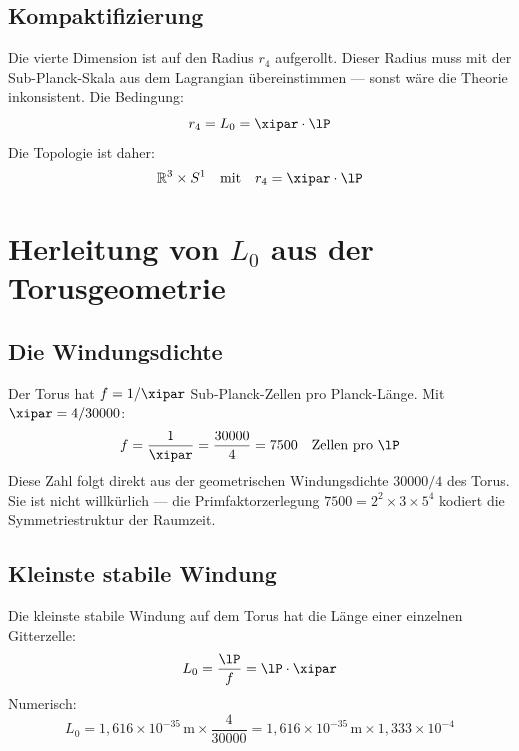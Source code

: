 \subsection{Kompaktifizierung}

Die vierte Dimension ist auf den Radius $r_4$ aufgerollt. Dieser Radius muss mit der Sub-Planck-Skala aus dem Lagrangian übereinstimmen — sonst wäre die Theorie inkonsistent. Die Bedingung:
\begin{equation}
	r_4 = L_0 = \xipar \cdot \lP
\end{equation}
Die Topologie ist daher:
\begin{equation}
	\mathbb{R}^3 \times S^1 \quad \text{mit} \quad r_4 = \xipar \cdot \lP
\end{equation}

\section{Herleitung von \texorpdfstring{$L_0$}{L0} aus der Torusgeometrie}

\subsection{Die Windungsdichte}

Der Torus hat $f = 1/\xipar$ Sub-Planck-Zellen pro Planck-Länge. Mit $\xipar = 4/30000$:
\begin{equation}
	f = \frac{1}{\xipar} = \frac{30000}{4} = 7500 \quad \text{Zellen pro } \lP
\end{equation}
Diese Zahl folgt direkt aus der geometrischen Windungsdichte $30000/4$ des Torus. Sie ist nicht willkürlich — die Primfaktorzerlegung $7500 = 2^2 \times 3 \times 5^4$ kodiert die Symmetriestruktur der Raumzeit.

\subsection{Kleinste stabile Windung}

Die kleinste stabile Windung auf dem Torus hat die Länge einer einzelnen Gitterzelle:
\begin{equation}
	L_0 = \frac{\lP}{f} = \lP \cdot \xipar
\end{equation}
Numerisch:
\begin{equation}
	L_0 = 1{,}616 \times 10^{-35}\,\text{m} \times \frac{4}{30000} = 1{,}616 \times 10^{-35}\,\text{m} \times 1{,}333 \times 10^{-4}
\end{equation}

